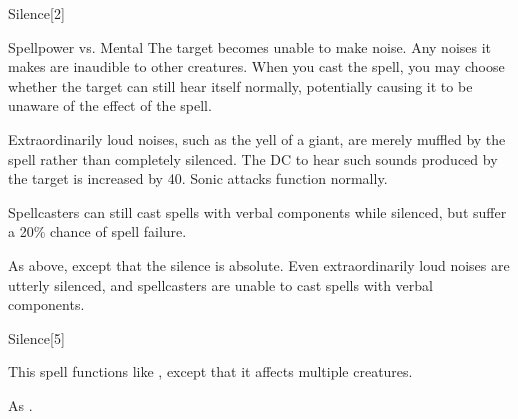 \begin{spellsection}{Silence}[2]
    \begin{spellheader}
    \end{spellheader}
    \begin{spellcontent}
        \begin{spelltargetinginfo}
        \end{spelltargetinginfo}
        \begin{spelleffects}
            \begin{spellattack}{Spellpower vs. Mental}
                \spellsuccess The target becomes unable to make noise. Any noises it makes are inaudible to other creatures. When you cast the spell, you may choose whether the target can still hear itself normally, potentially causing it to be unaware of the effect of the spell.

                Extraordinarily loud noises, such as the yell of a giant, are merely muffled by the spell rather than completely silenced. The DC to hear such sounds produced by the target is increased by 40. Sonic attacks function normally.

                Spellcasters can still cast spells with verbal components while silenced, but suffer a 20\% chance of spell failure.

                \spellcritical As above, except that the silence is absolute. Even extraordinarily loud noises are utterly silenced, and spellcasters are unable to cast spells with verbal components.
            \end{spellattack}
            \spelldur \durshort \dismissable
        \end{spelleffects}
    \end{spellcontent}
    \begin{spellfooter}
        \miscastrandom
    \end{spellfooter}
\end{spellsection}

\begin{spellsection}[Mass]{Silence}[5]
    \begin{spellheader}
    \end{spellheader}
    \begin{spellcontent}
        \begin{spelltargetinginfo}
        \end{spelltargetinginfo}
        \begin{spelleffects}
            \spellspecial This spell functions like , except that it affects multiple creatures.
        \end{spelleffects}
    \end{spellcontent}
    \begin{spellfooter}
        \spellnotes As .
        \miscastexplode
    \end{spellfooter}
\end{spellsection}


